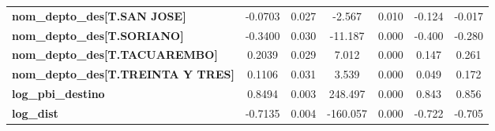 \begin{center}
\begin{tabular}{lcccccc}
\textbf{nom\_depto\_des[T.SAN JOSE]}        &      -0.0703  &        0.027     &    -2.567  &         0.010        &       -0.124    &       -0.017     \\
\textbf{nom\_depto\_des[T.SORIANO]}         &      -0.3400  &        0.030     &   -11.187  &         0.000        &       -0.400    &       -0.280     \\
\textbf{nom\_depto\_des[T.TACUAREMBO]}      &       0.2039  &        0.029     &     7.012  &         0.000        &        0.147    &        0.261     \\
\textbf{nom\_depto\_des[T.TREINTA Y TRES]}  &       0.1106  &        0.031     &     3.539  &         0.000        &        0.049    &        0.172     \\
\textbf{log\_pbi\_destino}                  &       0.8494  &        0.003     &   248.497  &         0.000        &        0.843    &        0.856     \\
\textbf{log\_dist}                          &      -0.7135  &        0.004     &  -160.057  &         0.000        &       -0.722    &       -0.705     \\
\bottomrule
\end{tabular}
\end{center}